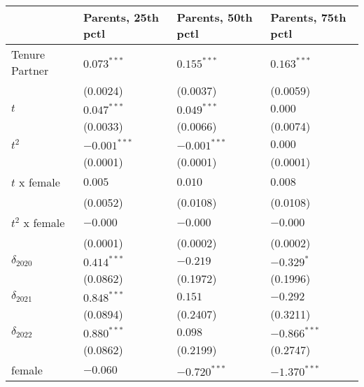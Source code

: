 \begin{tabular}{llll}
\toprule
{} & Parents, 25th pctl & Parents, 50th pctl & Parents, 75th pctl \\
\midrule
Tenure Partner                         &      $0.073^{***}$ &      $0.155^{***}$ &      $0.163^{***}$ \\
                                       &           (0.0024) &           (0.0037) &           (0.0059) \\
$t$                                    &      $0.047^{***}$ &      $0.049^{***}$ &            $0.000$ \\
                                       &           (0.0033) &           (0.0066) &           (0.0074) \\
$t^2$                                  &     $-0.001^{***}$ &     $-0.001^{***}$ &            $0.000$ \\
                                       &           (0.0001) &           (0.0001) &           (0.0001) \\
$t$ x female                           &            $0.005$ &            $0.010$ &            $0.008$ \\
                                       &           (0.0052) &           (0.0108) &           (0.0108) \\
$t^2$ x female                         &           $-0.000$ &           $-0.000$ &           $-0.000$ \\
                                       &           (0.0001) &           (0.0002) &           (0.0002) \\
$\delta_{2020}$                        &      $0.414^{***}$ &           $-0.219$ &         $-0.329^*$ \\
                                       &           (0.0862) &           (0.1972) &           (0.1996) \\
$\delta_{2021}$                        &      $0.848^{***}$ &            $0.151$ &           $-0.292$ \\
                                       &           (0.0894) &           (0.2407) &           (0.3211) \\
$\delta_{2022}$                        &      $0.880^{***}$ &            $0.098$ &     $-0.866^{***}$ \\
                                       &           (0.0862) &           (0.2199) &           (0.2747) \\
female                                 &           $-0.060$ &     $-0.720^{***}$ &     $-1.370^{***}$ \\

\end{tabular}
